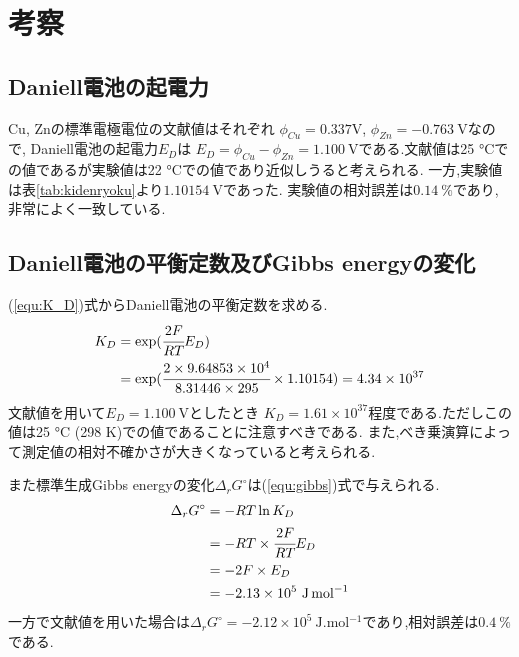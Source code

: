 \section{考察}
\subsection{Daniell電池の起電力}
Cu, Znの標準電極電位の文献値\cite{rikougaku}はそれぞれ
$\phi_{Cu}=0.337 \si{\volt}$, $\phi_{Zn}=-0.763\ \si{\volt}$なので, Daniell電池の起電力$E_D$は
$E_D=\phi_{Cu}-\phi_{Zn}=1.100\ \si{\volt}$である.文献値は25 \si{\degreeCelsius}での値であるが実験値は22 \si{\degreeCelsius}での値であり近似しうると考えられる.
一方,実験値は表\ref{tab:kidenryoku}より$1.10154\ \si{\volt}$であった.
実験値の相対誤差は$0.14\ \%$であり\cite{buturi},非常によく一致している.
\subsection{Daniell電池の平衡定数及びGibbs energyの変化}
(\ref{equ:K_D})式からDaniell電池の平衡定数を求める.
\begin{align}
  \label{equ:K_Djikken}
  K_D&=\exp(\cfrac{2F}{RT}E_D)\\
  &=\exp(\cfrac{2\times9.64853\times10^4}{8.31446\times295}\times1.10154)=4.34\times10^{37}
\end{align}
文献値を用いて$E_D=1.100\ \si{\volt}$としたとき $K_D=1.61\times10^{37}$程度である.ただしこの値は25 \si{\degreeCelsius} (298 \si{\kelvin})での値であることに注意すべきである.
また,べき乗演算によって測定値の相対不確かさが大きくなっていると考えられる.

また標準生成Gibbs energyの変化$\Delta_rG^{\circ}$は(\ref{equ:gibbs})式で与えられる\cite{rikougaku}.
\begin{align}
  \begin{aligned}
  \label{equ:gibbs}
  \Delta_rG^{\circ}&=-RT \ln K_D\\
  &=-RT\times\cfrac{2F}{RT}E_D\\
  &=-2F\times E_D\\
  &=-2.13\times10^5\ \si{\joule.\mole^{-1}}
  \end{aligned}
\end{align}
一方で文献値を用いた場合は$\Delta_rG^{\circ}=-2.12\times10^5\ \si{\joule.\mole^{-1}}$であり,相対誤差は$0.4\ \%$である.

